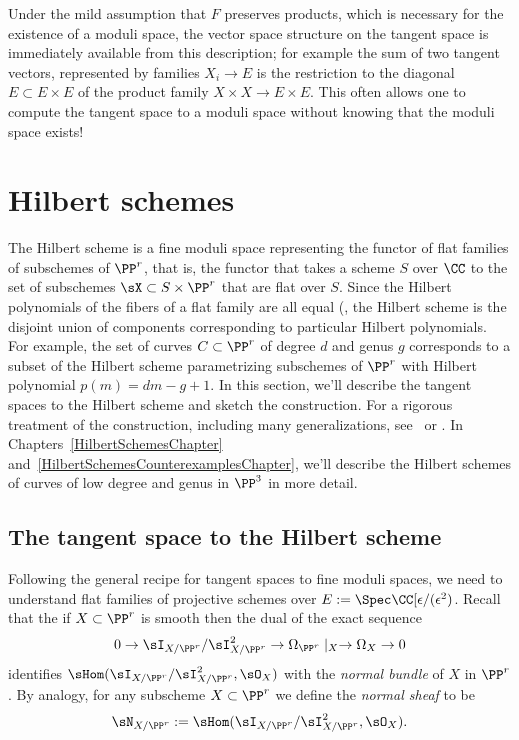 Under the mild
 assumption that $F$ preserves products, which is necessary for the existence of a moduli space, 
 the vector space structure on the tangent space is immediately available from this description; for example the
 sum of two tangent vectors, represented by families $X_i \to E$ is the restriction to the diagonal
 $E \subset E\times E$
 of the product family $X \times X \to E\times E$.
This often allows one to compute the tangent space to a moduli space without knowing that the moduli space exists!


\section{Hilbert schemes}\label{hilbert scheme section}

The Hilbert scheme is a fine moduli space representing the functor of flat families of subschemes of $\PP^r$,
that is, the functor that takes a scheme $S$ over $\CC$ to the set of subschemes $\sX \subset S\times \PP^r$
that are flat over $S$.
Since the Hilbert polynomials of the fibers of a flat family are all equal (\cite[Section III.9]{Hartshorne1977}, the Hilbert scheme is the disjoint union of components corresponding to particular Hilbert polynomials. For example, the set of curves $C \subset \PP^r$ of degree $d$ and genus $g$ corresponds to a subset of the Hilbert scheme parametrizing subschemes of $\PP^r$ with Hilbert polynomial $p(m) = dm - g + 1$. In this section, we'll describe
 the tangent spaces to the Hilbert scheme and sketch the construction. For a rigorous treatment of the construction, including many generalizations,  see~\cite{HomogHilbert} or \cite{MR2222646}. In Chapters~\ref{HilbertSchemesChapter} and~\ref{HilbertSchemesCounterexamplesChapter}, we'll describe  the Hilbert schemes of curves of low degree and genus in $\PP^3$ in more detail. 

\subsection{The tangent space to the Hilbert scheme}

Following the general recipe for tangent spaces to fine moduli spaces, we need to understand flat families
of projective schemes over $E := \Spec \CC[\eps/(\eps^2)$. Recall that the if $X\subset \PP^r$ is smooth then
the dual of the exact sequence
$$
0\to \sI_{X/\PP^r}/\sI_{X/\PP^r}^2 \to \Omega_{\PP^r}\mid_X \to \Omega_X \to 0
$$
identifies $\sHom(\sI_{X/\PP^r}/\sI_{X/\PP^r}^2, \sO_X)$ with the \emph{normal bundle} of $X$ in $\PP^r$.
By analogy, for any subscheme $X\subset \PP^r$ we define the \emph{normal sheaf} to be
$$
\sN_{X/\PP^r} := \sHom(\sI_{X/\PP^r}/\sI_{X/\PP^r}^2, \sO_X).
$$

